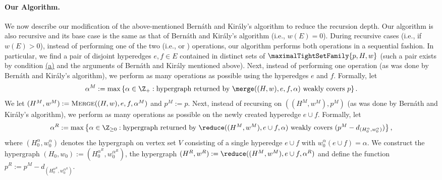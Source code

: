 \paragraph{Our Algorithm.}
We now describe our modification of the above-mentioned Bern\'{a}th and Kir\'{a}ly's algorithm to reduce the recursion depth. Our algorithm is also recursive and its 
base case is the same as that of Bern\'{a}th and Kir\'{a}ly's algorithm (i.e., $w(E)=0$). During recursive cases (i.e., if $w(E) > 0$), instead of performing one of the two (i.e., \merge or  \reduce) operations, our algorithm performs both operations in a sequential fashion. In particular, we find a pair of disjoint hyperedges $e, f\in E$ contained in distinct sets of $\maximalTightSetFamily{p, H, w}$ (such a pair exists by condition \hyperlink{WeakToStrong(a)}{(a)} and the arguments of Bern\'{a}th and Kir\'{a}ly mentioned above). Next, 
instead of performing one \merge operation (as was done by Bern\'{a}th and Kir\'{a}ly's algorithm), we perform as many  \merge operations as possible %
using the hyperedges $e$ and $f$. 
Formally, let $$\alpha^M := \max\left\{\alpha \in \Z_+ : \text{hypergraph returned by } \merge((H, w), e, f, \alpha) \text{ weakly covers } p\right\}.$$
We let $(H^M, w^M):=\textsc{Merge}((H, w), e, f, \alpha^M)$ and $p^M:=p$.
Next, instead of recursing on $((H^M, w^M), p^M)$ (as was done by Bern\'{a}th and Kir\'{a}ly's algorithm), we perform as many \reduce operations as possible 
on the newly created hyperedge $e\cup f$.
Formally, let $$\alpha^R := \max\left\{\alpha \in \Z_{\ge 0}: \text{hypergraph returned by } \reduce((H^M, w^M), e \cup f, \alpha) \text{ weakly covers } (p^M - d_{(H_0^\alpha, w_0^\alpha)})\right\},$$
where $(H_0^{\alpha}, w_0^{\alpha})$ denotes
the hypergraph on vertex set $V$ consisting of a single hyperedge $e\cup f$ with $w_0^{\alpha}(e\cup f) = \alpha$. 
We construct the hypergraph 
$(H_0, w_0):=(H_0^{\alpha^R}, w_0^{\alpha^R})$, the hypergraph $(H^R, w^R):=\reduce((H^M, w^M), e\cup f, \alpha^R)$ and define the function $p^R:=p^M - d_{(H_0^{\alpha^R}, w_0^{\alpha^R})}$.
